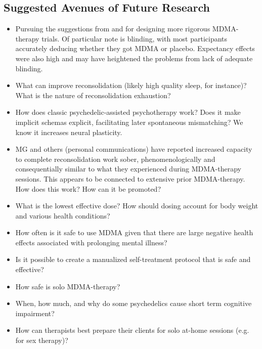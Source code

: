 \documentclass[12pt,letterpaper]{article}
\begin{document}
\subsection{Suggested Avenues of Future Research}
\begin{itemize}
    \item Pursuing the suggestions from \textcite{adayMethodologicalRigor} and \textcite{vanElkMethodology} for designing more rigorous MDMA-therapy trials. Of particular note is blinding, with most participants accurately deducing whether they got MDMA or placebo. Expectancy effects were also high and may have heightened the problems from lack of adequate blinding.
    \item What can improve reconsolidation (likely high quality sleep, for instance)? What is the nature of reconsolidation exhaustion?
    \item How does classic psychedelic-assisted psychotherapy work? Does it make implicit schemas explicit, facilitating later spontaneous mismatching? We know it increases neural plasticity.
    \item MG and others (personal communications) have reported increased capacity to complete reconsolidation work sober, phenomenologically and consequentially similar to what they experienced during MDMA-therapy sessions. This appears to be connected to extensive prior MDMA-therapy. How does this work? How can it be promoted?
    \item What is the lowest effective dose? How should dosing account for body weight and various health conditions?
    \item How often is it safe to use MDMA given that there are large negative health effects associated with prolonging mental illness?
    \item Is it possible to create a manualized self-treatment protocol that is safe and effective?
    \item How safe is solo MDMA-therapy?
    \item When, how much, and why do some psychedelics cause short term cognitive impairment?
    \item How can therapists best prepare their clients for solo at-home sessions (e.g. for sex therapy)?
\end{itemize}
\printbibliography
{}
\end{document}
